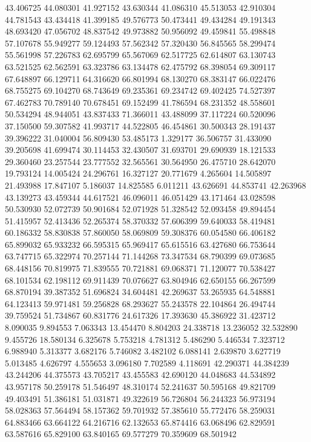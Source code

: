 43.406725
44.080301
41.927152
43.630344
41.086310
45.513053
42.910304
44.781543
43.434418
41.399185
49.576773
50.473441
49.434284
49.191343
48.693420
47.056702
48.837542
49.973882
50.956092
49.459841
55.498848
57.107678
55.949277
59.124493
57.562342
57.320430
56.845565
58.299474
55.561998
57.226783
62.695799
65.567069
62.517725
62.614807
63.130743
63.521525
62.562591
63.323786
63.134478
62.475792
68.398054
69.309117
67.648897
66.129711
64.316620
66.801994
68.130270
68.383147
66.022476
68.755275
69.104270
68.743649
69.235361
69.234742
69.402425
74.527397
67.462783
70.789140
70.678451
69.152499
41.786594
68.231352
48.558601
50.534294
48.944051
43.837433
71.366011
43.488099
37.117224
60.520096
37.150500
59.307582
41.993717
44.522805
46.454861
30.500343
28.191437
39.396222
31.040004
56.809430
53.485173
1.329177
36.506757
31.433090
39.205698
41.699474
30.114453
32.430507
31.693701
29.690939
18.121533
29.360460
23.257544
23.777552
32.565561
30.564950
26.475710
28.642070
19.793124
14.005424
24.296761
16.327127
20.771679
4.265604
14.505897
21.493988
17.847107
5.186037
14.825585
6.011211
43.626691
44.853741
42.263968
43.139273
43.459344
44.617521
46.096011
46.051429
43.171464
43.028598
50.530930
52.072739
50.901684
52.071928
51.328542
52.093458
49.894454
51.415957
52.413436
52.265374
58.370332
57.606399
59.640033
58.419481
60.186332
58.830838
57.860050
58.069809
59.308376
60.054580
66.406182
65.899032
65.933232
66.595315
65.969417
65.615516
63.427680
66.753644
63.747715
65.322974
70.257144
71.144268
73.347534
68.790399
69.073685
68.448156
70.819975
71.839555
70.721881
69.068371
71.120077
70.538427
68.101534
62.198112
69.911439
70.076627
63.804946
62.650155
66.267599
68.870194
39.387352
51.696824
34.604481
42.269637
53.265935
64.548881
64.123413
59.971481
59.256828
68.293627
55.243578
22.104864
26.494744
39.759524
51.734867
60.831776
24.617326
17.393630
45.386922
31.423712
8.090035
9.894553
7.063343
13.454470
8.804203
24.338718
13.236052
32.532890
9.455726
18.580134
6.325678
5.753218
4.781312
5.486290
5.446534
7.323712
6.988940
5.313377
3.682176
5.746082
3.482102
6.088141
2.639870
3.627719
5.013485
4.626797
4.555653
3.096180
7.702589
4.118691
42.290371
44.384239
43.244206
44.375573
43.705217
43.455583
42.690120
44.048683
44.534892
43.957178
50.259178
51.546497
48.310174
52.241637
50.595168
49.821709
49.403491
51.386181
51.031871
49.322619
56.726804
56.244323
56.973194
58.028363
57.564494
58.157362
59.701932
57.385610
55.772476
58.259031
64.883466
63.664122
64.216716
62.132653
65.874416
63.068496
62.829591
63.587616
65.829100
63.840165
69.577279
70.359609
68.501942
